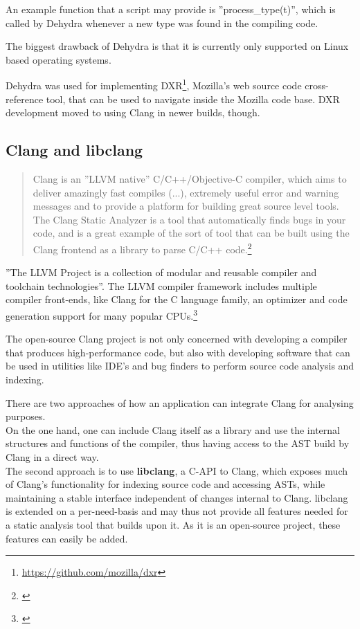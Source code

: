 An example function that a script may provide is ''process\_type(t)'', which is called by Dehydra whenever a new type was found in the compiling code.

The biggest drawback of Dehydra is that it is currently only supported on Linux based operating systems.

Dehydra was used for implementing DXR\footnote{\url{https://github.com/mozilla/dxr}}, Mozilla's web source code cross-reference tool, that can be used to navigate inside the Mozilla code base. DXR development moved to using Clang in newer builds, though.

\subsection{Clang and libclang}

\begin{quotation}
Clang is an ''LLVM native'' C/C++/Objective-C compiler, which aims to deliver amazingly fast compiles (...), extremely useful error and warning messages and to provide a platform for building great source level tools. The Clang Static Analyzer is a tool that automatically finds bugs in your code, and is a great example of the sort of tool that can be built using the Clang frontend as a library to parse C/C++ code.\footnote{\citep{LLVMHP}}
\end{quotation}

''The LLVM Project is a collection of modular and reusable compiler and toolchain technologies''. The LLVM compiler framework includes multiple compiler front-ends, like Clang for the C language family, an optimizer and code generation support for many popular CPUs.\footnote{\citep{LLVMHP}}

The open-source Clang project is not only concerned with developing a compiler that produces high-performance code, but also with developing software that can be used in utilities like IDE's and bug finders to perform source code analysis and indexing.

There are two approaches of how an application can integrate Clang for analysing purposes.
\\On the one hand, one can include Clang itself as a library and use the internal structures and functions of the compiler, thus having access to the AST build by Clang in a direct way.
\\The second approach is to use \textbf{libclang}, a C-API to Clang, which exposes much of Clang's functionality for indexing source code and accessing ASTs, while maintaining a stable interface independent of changes internal to Clang. libclang is extended on a per-need-basis and may thus not provide all features needed for a static analysis tool that builds upon it. As it is an open-source project, these features can easily be added.

